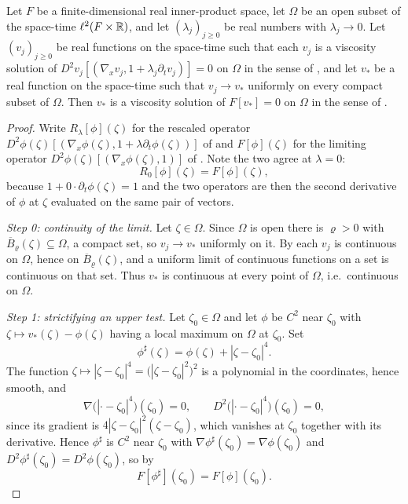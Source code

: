 \begin{lemma}
Let $F$ be a finite-dimensional real inner-product space, let $\Omega$ be an
open subset of the space-time $\ell^2(F\times\mathbb{R})$, and let
$(\lambda_j)_{j\ge0}$ be real numbers with $\lambda_j\to0$. Let
$(v_j)_{j\ge0}$ be real functions on the space-time such that each $v_j$ is a
viscosity solution of $D^2v_j[(\nabla_xv_j,1+\lambda_j\partial_tv_j)]=0$ on
$\Omega$ in the sense of , and let $v_*$ be a real
function on the space-time such that $v_j\to v_*$ uniformly on every compact
subset of $\Omega$. Then $v_*$ is a viscosity solution of $F[v_*]=0$ on
$\Omega$ in the sense of .
\end{lemma}
\begin{proof}
Write $R_\lambda[\phi](\zeta)$ for the rescaled operator
$D^2\phi(\zeta)[(\nabla_x\phi(\zeta),1+\lambda\partial_t\phi(\zeta))]$ of
 and $F[\phi](\zeta)$ for the limiting operator
$D^2\phi(\zeta)[(\nabla_x\phi(\zeta),1)]$ of . Note the two
agree at $\lambda=0$:
\begin{equation}\label{eq:rls-zero}
  R_0[\phi](\zeta)=F[\phi](\zeta),
\end{equation}
because $1+0\cdot\partial_t\phi(\zeta)=1$ and the two operators are then the
second derivative of $\phi$ at $\zeta$ evaluated on the same pair of vectors.

\emph{Step 0: continuity of the limit.}
Let $\zeta\in\Omega$. Since $\Omega$ is open there is $\varrho>0$ with
$\overline B_\varrho(\zeta)\subseteq\Omega$, a compact set, so $v_j\to v_*$
uniformly on it. By  each $v_j$ is continuous on
$\Omega$, hence on $\overline B_\varrho(\zeta)$, and a uniform limit of
continuous functions on a set is continuous on that set. Thus $v_*$ is
continuous at every point of $\Omega$, i.e.\ continuous on $\Omega$.

\emph{Step 1: strictifying an upper test.}
Let $\zeta_0\in\Omega$ and let $\phi$ be $C^2$ near $\zeta_0$ with
$\zeta\mapsto v_*(\zeta)-\phi(\zeta)$ having a local maximum on $\Omega$ at
$\zeta_0$. Set
\[
  \phi^\sharp(\zeta)=\phi(\zeta)+|\zeta-\zeta_0|^4 .
\]
The function $\zeta\mapsto|\zeta-\zeta_0|^4=\bigl(|\zeta-\zeta_0|^2\bigr)^2$ is a
polynomial in the coordinates, hence smooth, and
\begin{equation}\label{eq:rls-fourth}
  \nabla\bigl(|\cdot-\zeta_0|^4\bigr)(\zeta_0)=0,
  \qquad
  D^2\bigl(|\cdot-\zeta_0|^4\bigr)(\zeta_0)=0 ,
\end{equation}
since its gradient is $4|\zeta-\zeta_0|^2(\zeta-\zeta_0)$, which vanishes at
$\zeta_0$ together with its derivative. Hence $\phi^\sharp$ is $C^2$ near
$\zeta_0$ with $\nabla\phi^\sharp(\zeta_0)=\nabla\phi(\zeta_0)$ and
$D^2\phi^\sharp(\zeta_0)=D^2\phi(\zeta_0)$, so by 
\begin{equation}\label{eq:rls-same-jet}
  F[\phi^\sharp](\zeta_0)=F[\phi](\zeta_0).
\end{equation}


\end{proof}

